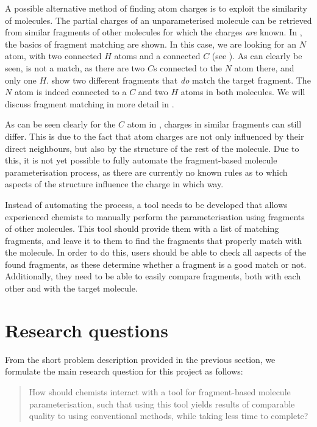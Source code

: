 A possible alternative method of finding atom charges is to exploit the similarity of molecules. The partial charges of an unparameterised molecule can be retrieved from similar fragments of other molecules for which the charges \emph{are} known. In , the basics of fragment matching are shown. In this case, we are looking for an $N$ atom, with two connected $H$ atoms and a connected $C$ (see ). As can clearly be seen,  is not a match, as there are two $C$s connected to the $N$ atom there, and only one $H$.  show two different fragments that \emph{do} match the target fragment. The $N$ atom is indeed connected to a $C$ and two $H$ atoms in both molecules. We will discuss fragment matching in more detail in .

As can be seen clearly for the $C$ atom in , charges in similar fragments can still differ. This is due to the fact that atom charges are not only influenced by their direct neighbours, but also by the structure of the rest of the molecule. Due to this, it is not yet possible to fully automate the fragment-based molecule parameterisation process, as there are currently no known rules as to which aspects of the structure influence the charge in which way.

Instead of automating the process, a tool needs to be developed that allows experienced chemists to manually perform the parameterisation using fragments of other molecules. This tool should provide them with a list of matching fragments, and leave it to them to find the fragments that properly match with the molecule. In order to do this, users should be able to check all aspects of the found fragments, as these determine whether a fragment is a good match or not. Additionally, they need to be able to easily compare fragments, both with each other and with the target molecule.



\section{Research questions}
From the short problem description provided in the previous section, we formulate the main research question for this project as follows:
\begin{quote}
How should chemists interact with a tool for fragment-based molecule parameterisation, such that using this tool yields results of comparable quality to using conventional methods, while taking less time to complete?
\end{quote}

